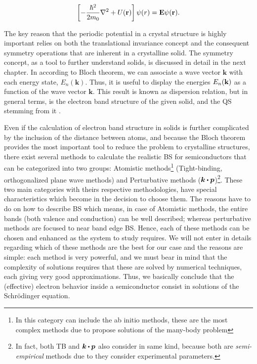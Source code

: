 \begin{equation}
	\left[-\dfrac{\hbar^2}{2m_{0}}\nabla^2 + U(\displaystyle\mathrm{\bf r})\right]\psi (r)=\displaystyle\mathrm{\bf E}\psi(\displaystyle\mathrm{\bf r}).
	\label{eq:chapter-1-first-sch}
\end{equation}

The key reason that the periodic potential in a crystal structure is highly important relies on both the translational invariance concept and the consequent symmetry operations that are inherent in a crystalline solid. The symmetry concept, as a tool to further understand solids, is discussed in detail in the next chapter. In according to Bloch theorem, we can associate a wave vector $\boldsymbol{k}$ with each energy state, $E_{n}(\boldsymbol{k})$. Thus, it is useful to display the energies $E_{n}(\bf{k})$ as a function of the wave vector $\boldsymbol{k}$. This result is known as dispersion relation, but in general terms, is the electron band structure of the given solid, and the \gls{QS} stemming from it \cite{piprek2017handbook}.   

Even if the calculation of electron band structure in solids is further complicated by the inclusion of the distance between atoms, and because the Bloch theorem provides the most important tool to reduce the problem to crystalline structures, there exist several methods to calculate the realistic \gls{BS} for semiconductors that can be categorized into two groups: Atomistic methods\footnote{In this category can include the ab initio methods, these are the most complex methods due to propose  solutions of the many-body problem} (Tight-binding, orthogonalized plane wave methods) and Perturbative methods ($\boldsymbol{k}\bigcdot \boldsymbol{p}$)\footnote{In fact, both TB and $\boldsymbol{k}\bigcdot \boldsymbol{p}$ also consider in same kind, because both are \emph{semi-empirical} methods due to they consider experimental parameters.}. 
These two main categories with theirs respective methodologies, have special characteristics which become in the decision to choose them. The reasons have to do on how to describe \gls{BS} which means, in case of Atomistic methods, the entire bands  (both valence and conduction) can be well described; whereas  perturbative methods are focused to near band edge \gls{BS}. Hence, each of these methods can be chosen and enhanced as the system to study requires. 
We will not enter in details regarding  which of these methods are the best for our case and the reasons are simple: each method is very powerful, and we must bear in mind that the complexity of solutions requires that these are solved by numerical techniques, each giving very good approximations. 
Thus, we basically conclude that the (effective) electron behavior inside a semiconductor consist in solutions of the Schrödinger equation\cite{boer2018semiconductor}.  
